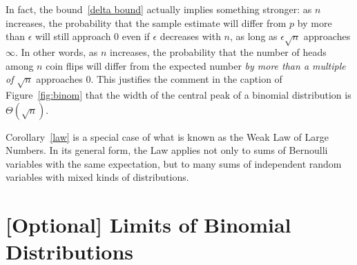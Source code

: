 \documentclass[11pt,twoside]{article}
\begin{document}
In fact, the bound~\eqref{delta bound} actually implies something
stronger: as $n$ increases, the probability that the sample estimate will
differ from $p$ by more than $\epsilon$ will still approach 0 even if
$\epsilon$ decreases with $n$, as long as $\epsilon \sqrt{n}$ approaches
$\infty$.  In other words, as $n$ increases, the probability that the
number of heads among $n$ coin flips will differ from the expected number
\emph{by more than a multiple of $\sqrt{n}$} approaches 0.  This justifies
the comment in the caption of Figure~\ref{fig:binom} that the width of the
central peak of a binomial distribution is $\Theta(\sqrt{n})$.

Corollary~\ref{law} is a special case of what is known as the Weak Law of
Large Numbers.  In its general form, the Law applies not only to sums of
Bernoulli variables with the same expectation, but to many sums of
independent random variables with mixed kinds of distributions.
 
\section{[Optional] Limits of Binomial Distributions}
\end{document}
